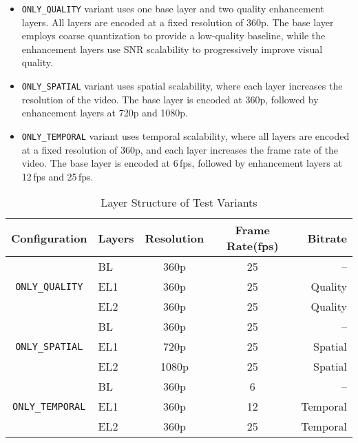         \begin{itemize}
            \item {
                \texttt{ONLY\_QUALITY} variant uses one base layer and two quality
                enhancement layers. All layers are encoded at a fixed resolution of
                360p. The base layer employs coarse quantization to provide a
                low-quality baseline, while the enhancement layers use SNR
                scalability to progressively improve visual quality.
            } 
            \item {
                \texttt{ONLY\_SPATIAL} variant uses spatial scalability, where each
                layer increases the resolution of the video. The base layer is
                encoded at 360p, followed by enhancement layers at 720p and 1080p.
            }

            \item {
                \texttt{ONLY\_TEMPORAL} variant uses temporal scalability, where all
                layers are encoded at a fixed resolution of 360p, and each layer
                increases the frame rate of the video. The base layer is encoded at
                6\,fps, followed by enhancement layers at 12\,fps and 25\,fps.
            } 
        \end{itemize}

        \begin{table}[H]
            \centering
            \begin{tabular}{clccr}
                Configuration       & Layers            & Resolution & Frame Rate(fps) & Bitrate \\
                \midrule
                \multirow{3}{*}{\texttt{ONLY\_QUALITY}} 
                                    & BL                & 360p       & 25      & -- \\
                                    & EL1               & 360p       & 25      & Quality \\
                                    & EL2               & 360p       & 25      & Quality \\
                \midrule
                \multirow{3}{*}{\texttt{ONLY\_SPATIAL}} 
                                    & BL                & 360p       & 25      & -- \\
                                    & EL1               & 720p       & 25      & Spatial \\
                                    & EL2               & 1080p      & 25      & Spatial \\
                \midrule
                \multirow{3}{*}{\texttt{ONLY\_TEMPORAL}} 
                                    & BL                & 360p       & 6      & -- \\
                                    & EL1               & 360p       & 12      & Temporal \\
                                    & EL2               & 360p       & 25      & Temporal \\
            \end{tabular}
            \caption{Layer Structure of Test Variants}
            \label{tab:test_video_layer_structure}
        \end{table}

